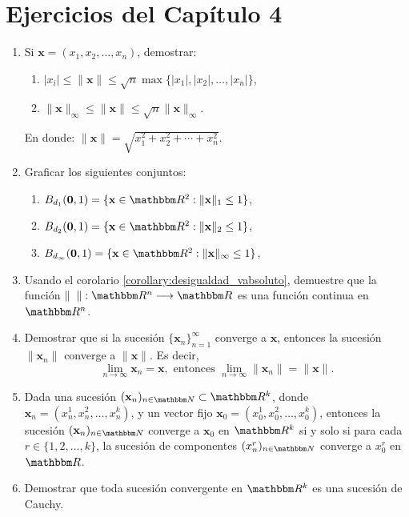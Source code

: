 \section{Ejercicios del Capítulo 4}

\begin{enumerate}
    \item Si $\mathbf{x} = (x_1, x_2, \dots, x_n)$, demostrar:
    \begin{enumerate}
        \item $|x_i| \leq \| \mathbf{x} \| \leq \sqrt{n} \max \{ |x_1|, |x_2|, \dots, |x_n|\}$,
        \item $\| \mathbf{x} \|_{\infty} \leq \| \mathbf{x} \| \leq \sqrt{n} \| \mathbf{x} \|_{\infty}$.
    \end{enumerate}
    En donde: $\| \mathbf{x} \| = \sqrt{x_1^2 + x_2^2 + \cdots + x_n^2}$.
    \item Graficar los siguientes conjuntos:
    \begin{enumerate}
        \item $B_{d_1}(\mathbf{0}, 1) = \{ \mathbf{x} \in \RR[2] : \| \mathbf{x} \|_1 \leq 1 \}$,
        \item $B_{d_2}(\mathbf{0}, 1) = \{ \mathbf{x} \in \RR[2] : \| \mathbf{x} \|_2 \leq 1 \}$,
        \item $B_{d_{\infty}}(\mathbf{0}, 1) = \{ \mathbf{x} \in \RR[2] : \| \mathbf{x} \|_{\infty} \leq 1 \}$,
    \end{enumerate}
    \item Usando el corolario \ref{corollary:desigualdad_vabsoluto}, demuestre que la función $\| \phantom{x} \|: \RR[n] \longrightarrow \RR$ es una función continua en $\RR[n]$.
    \item Demostrar que si la sucesión $\{ \mathbf{x}_n \}_{n = 1}^{\infty}$ converge a $\mathbf{x}$, entonces la sucesión $\| \mathbf{x}_n \|$ converge a $\| \mathbf{x} \|$. Es decir,
    $$\lim_{n \to \infty} \mathbf{x}_n = \mathbf{x}, \text{ entonces } \lim_{n \to \infty} \| \mathbf{x}_n \| = \| \mathbf{x} \|.$$
    \item Dada una sucesión $(\mathbf{x}_n)_{n \in \NN} \subset \RR[k]$, donde $\mathbf{x}_n = \left(x_n^1, x_n^2, \dots, x_n^k\right)$, y un vector fijo $\mathbf{x}_0 = \left(x_0^1, x_0^2, \dots, x_0^k\right)$, entonces la sucesión $(\mathbf{x}_n)_{n \in \NN}$ converge a $\mathbf{x}_0$ en $\RR[k]$ si y solo si para cada $r \in \{ 1, 2, \dots, k \}$, la sucesión de componentes $(x_n^r)_{n \in \NN}$ converge a $x_0^r$ en $\RR$.
    \item Demostrar que toda sucesión convergente en $\RR[k]$ es una sucesión de Cauchy.

\end{enumerate}
